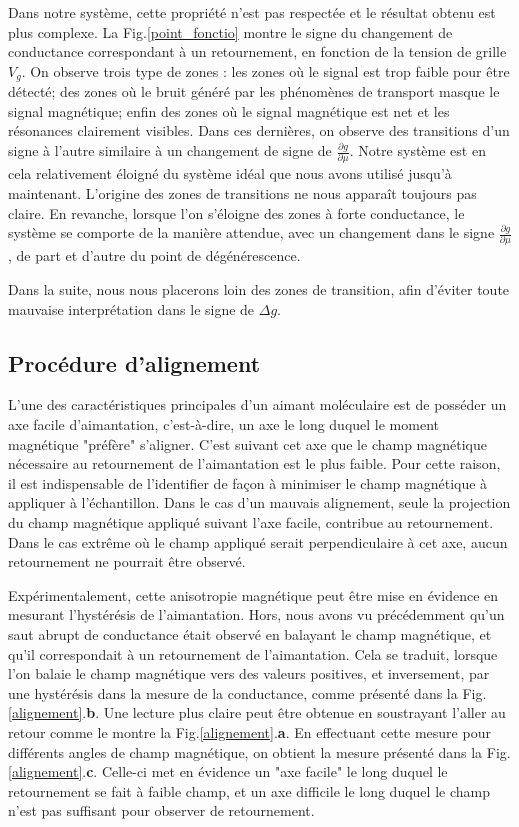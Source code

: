 Dans notre système, cette propriété n'est pas respectée et le résultat obtenu est plus complexe. La Fig.\ref{point_fonctio} montre le signe du changement de conductance correspondant à un retournement, en fonction de la tension de grille $V_g$. On observe trois type de zones : les zones où le signal est trop faible pour être détecté; des zones où le bruit généré par les phénomènes de transport masque le signal magnétique; enfin des zones où le signal magnétique est net et les résonances clairement visibles. Dans ces dernières, on observe des transitions d'un signe à l'autre similaire à un changement de signe de $\frac{\partial g}{\partial \mu}$. Notre système est en cela relativement éloigné du système idéal que nous avons utilisé jusqu'à maintenant. L'origine des zones de transitions ne nous apparaît toujours pas claire. En revanche, lorsque l'on s'éloigne des zones à forte conductance, le système se comporte de la manière attendue, avec un changement dans le signe $\frac{\partial g}{\partial \mu}$, de part et d'autre du point de dégénérescence.

Dans la suite, nous nous placerons loin des zones de transition, afin d'éviter toute mauvaise interprétation dans le signe de $\Delta g$.


\subsection{Procédure d'alignement}

L'une des caractéristiques principales d'un aimant moléculaire est de posséder un axe facile d'aimantation, c'est-à-dire, un axe le long duquel le moment magnétique "préfère" s'aligner. C'est suivant cet axe que le champ magnétique nécessaire au retournement de l'aimantation est le plus faible. Pour cette raison, il est indispensable de l'identifier de façon à minimiser le champ magnétique à appliquer à l'échantillon. Dans le cas d'un mauvais alignement, seule la projection du champ magnétique appliqué suivant l'axe facile,  contribue au retournement. Dans le cas extrême où le champ appliqué serait perpendiculaire à cet axe, aucun retournement ne pourrait être observé.

Expérimentalement, cette anisotropie magnétique peut être mise en évidence en mesurant l'hystérésis de l'aimantation. Hors, nous avons vu précédemment qu'un saut abrupt de conductance était observé en balayant le champ magnétique, et qu'il correspondait à un retournement de l'aimantation. Cela se traduit, lorsque l'on balaie le champ magnétique vers des valeurs positives, et inversement, par une hystérésis dans la mesure de la conductance, comme présenté dans la Fig.\ref{alignement}.\textbf{b}. Une lecture plus claire peut être obtenue en soustrayant l'aller au retour comme le montre la Fig.\ref{alignement}.\textbf{a}. En effectuant cette mesure pour différents angles de champ magnétique, on obtient la mesure présenté dans la Fig.\ref{alignement}.\textbf{c}. Celle-ci met en évidence un "axe facile" le long duquel le retournement se fait à faible champ, et un axe difficile le long duquel le champ n'est pas suffisant pour observer de retournement.

